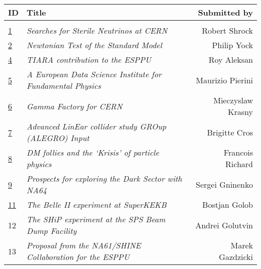 \begin{flushleft}
\begin{tabular}{llr} 
\bf ID & \bf Title & \bf Submitted by \\ \hline 
\vspace*{-3mm} & & \\
\href{https://indico.cern.ch/event/765096/contributions/3295508/attachments/1785100/2905996/cern.pdf}{1} & \it Searches for Sterile Neutrinos at CERN & Robert Shrock\\
\href{https://indico.cern.ch/event/765096/contributions/3295509/attachments/1785101/2905999/Yock.pdf}{2} & \it Newtonian Test of the Standard Model & Philip Yock \\
\href{https://indico.cern.ch/event/765096/contributions/3295511/attachments/1785103/2906003/TIARA_ES2020-contribution_final.pdf}{4} & \it TIARA contribution to the ESPPU & Roy Aleksan\\
\href{https://indico.cern.ch/event/765096/contributions/3295512/attachments/1785106/2906008/A_European_Data_Science_Institute_for_Particle_Physics.pdf}{5} & \it A European Data Science Institute for Fundamental Physics\hspace*{1cm} & Maurizio Pierini\\
\href{https://indico.cern.ch/event/765096/contributions/3295513/attachments/1785107/2906010/Gamma_Factory.pdf}{6} & \it Gamma Factory for CERN & Mieczyslaw Krasny \\
\href{https://indico.cern.ch/event/765096/contributions/3295514/attachments/1785110/2906015/2018_ALEGRO_ESPP.pdf}{7} & \it Advanced LinEar collider study GROup (ALEGRO) Input & Brigitte Cros\\
\href{https://indico.cern.ch/event/765096/contributions/3295516/attachments/1785111/2906018/European_Strategy.pdf}{8} & \it DM follies and the `Krisis' of particle physics & Francois Richard\\
\href{https://indico.cern.ch/event/765096/contributions/3295517/attachments/1785115/2906025/na64-epps-2018.pdf}{9} & \it Prospects for exploring the Dark Sector with NA64 & Sergei Gninenko\\
\href{https://indico.cern.ch/event/765096/contributions/3295519/attachments/1785116/2906032/main1.pdf}{11} & \it The Belle II experiment at SuperKEKB & Bostjan Golob\\
12 & \it The SHiP experiment at the SPS Beam Dump Facility & Andrei Golutvin \\
13 & \it Proposal from the NA61/SHINE Collaboration for the ESPPU & Marek Gazdzicki \\

\end{tabular}
\end{flushleft}
